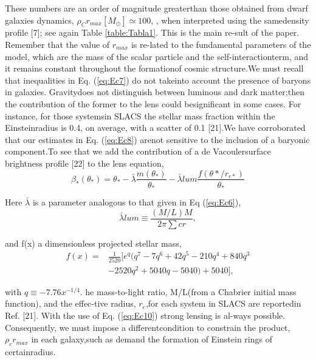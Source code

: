 \documentclass[9.5pt, twocolumn]{article}
\begin{document}
These  numbers  are  an  order  of  magnitude  greaterthan   those   obtained   from   dwarf   galaxies   dynamics, \(\rho_{C}r_{max}[M_{\odot}]\simeq 100\), , when interpreted using the samedensity profile [7]; see again Table \ref{table:Tabla1}. This is the main re-sult of the paper.  Remember that the value of \(r_{max}\) is re-lated to the fundamental parameters of the model, which are the mass of the scalar particle and the self-interactionterm, and it remains constant throughout the formationof cosmic structure.We must recall that inequalities in Eq.  (\ref{eq:Ec7}) do not takeinto account the presence of baryons in galaxies.  Gravitydoes not distinguish between luminous and dark matter;then the contribution of the former to the lens could besignificant in some cases.  For instance, for those systemsin SLACS the stellar mass fraction within the Einsteinradius is 0.4, on average, with a scatter of 0.1 [21].We have corroborated that our estimates in Eq. (\ref{eq:Ec8}) arenot sensitive to the inclusion of a baryonic component.To  see  that  we  add  the  contribution  of  a  de  Vacoulersurface brightness profile [22] to the lens equation,
\begin{equation}
	\beta_{*}(\theta_{*})=\theta_{*}-\bar{\lambda} \frac{m(\theta_{*})}{\theta_{*}}-\bar{\lambda}{lum} \frac{f(\theta{*}/r_{e*})}{\theta_{*}}
	\label{eq:Ec10}
\end{equation}

 Here \(\bar\lambda\) is  a  parameter  analogous  to  that  given  in Eq (\ref{eq:Ec6}),
\begin{equation}
	\bar{\lambda}{lum}\equiv \frac{(M/L)M}{2\pi\sum{cr}},
	\label{eq:Ec11}
\end{equation} 

and f(x) a dimensionless projected stellar mass,
\begin{align*}\tag{12}
	 f(x)=&\frac{1}{2520}[e^{q}(q^{7}-7q^{6}+42q^{5}-210q^{4}+840q^{3} \\ 
	 &-2520q^{2}+5040q-5040)+5040],
	 \label{eq:Ec12}
\end{align*}

with \(q\equiv -7.76x^{-1/4}\). he  mass-to-light  ratio, M/L(from  a  Chabrier  initial  mass  function),  and  the  effec-tive radius, \(r_{e}\),for each system in SLACS are reportedin Ref. [21].  With the use of Eq.  (\ref{eq:Ec10}) strong lensing is al-ways possible.  Consequently, we must impose a differentcondition to constrain the product, \(\rho_{c}r_{max}\) in each galaxy,such as demand the formation of Einstein rings of certainradius.
\end{document}
